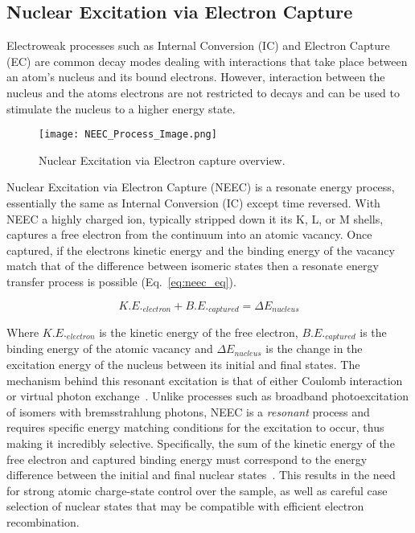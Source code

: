 \documentclass[jon_ringuette_thesis_proposal.tex]{subfiles}
\begin{document}
    \subsection{Nuclear Excitation via Electron Capture}
    Electroweak processes such as Internal Conversion (IC) and Electron Capture (EC) are common decay modes dealing with interactions that take place between an atom's nucleus and its bound electrons.
    However, interaction between the nucleus and the atoms electrons are not restricted to decays and can be used to stimulate the nucleus to a higher energy state.

    \begin{figure}[H]
        \begin{center}
            \texttt{[image: NEEC\_Process\_Image.png]}
        \end{center}
        \caption{Nuclear Excitation via Electron capture overview. \cite{eec_SOP_NEEC}}
        \label{fig:neec_process}
    \end{figure}

    Nuclear Excitation via Electron Capture (NEEC) is a resonate energy process, essentially the same as Internal Conversion (IC) except time reversed.
    With NEEC a highly charged ion, typically stripped down it its K, L, or M shells, captures a free electron from the continuum into an atomic vacancy.
    Once captured, if the electrons kinetic energy and the binding energy of the vacancy match that of the difference between isomeric states then a resonate energy transfer process is possible (Eq.~\ref{eq:neec_eq}).

    \begin{equation}
        K.E._{electron} + B.E._{captured} = \Delta E_{nucleus}
        \label{eq:neec_eq}
    \end{equation}

    Where $K.E._{electron}$ is the kinetic energy of the free electron, $B.E._{captured}$ is the binding energy of the atomic vacancy and $\Delta E_{nucleus}$ is the change in the excitation energy of the nucleus between its initial and final states.
    The mechanism behind this resonant excitation is that of either Coulomb interaction or virtual photon exchange~\cite{PALFFY_2007}.
    Unlike processes such as broadband photoexcitation of isomers with bremsstrahlung photons, NEEC is a \textit{resonant} process and requires specific energy matching conditions for the excitation to occur, thus making it incredibly selective.
    Specifically, the sum of the kinetic energy of the free electron and captured binding energy must correspond to the energy difference between the initial and final nuclear states~\cite{PALFFY_2007}.
    This results in the need for strong atomic charge-state control over the sample, as well as careful case selection of nuclear states that may be compatible with efficient electron recombination.
\end{document}
